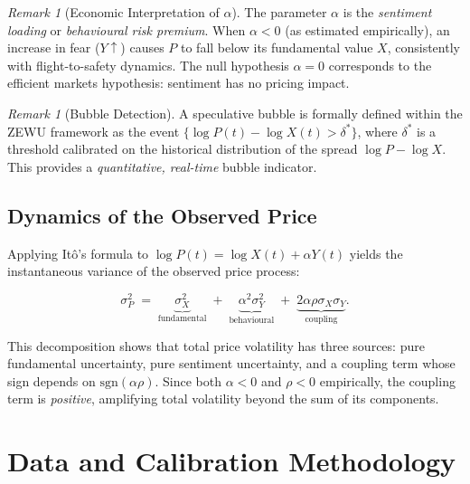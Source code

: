 \documentclass[12pt,a4paper]{article}
\theoremstyle{definition}
\theoremstyle{remark}
\newtheorem{remark}[theorem]{Remark}
\begin{document}
\begin{remark}[Economic Interpretation of $\alpha$]
  The parameter $\alpha$ is the \emph{sentiment loading} or
  \emph{behavioural risk premium}. When $\alpha < 0$ (as estimated
  empirically), an increase in fear ($Y \uparrow$) causes $P$ to fall
  below its fundamental value $X$, consistently with flight-to-safety
  dynamics. The null hypothesis $\alpha = 0$ corresponds to the
  efficient markets hypothesis: sentiment has no pricing impact.
\end{remark}

\begin{remark}[Bubble Detection]
  A speculative bubble is formally defined within the ZEWU framework as
  the event $\{\log P(t) - \log X(t) > \delta^*\}$, where $\delta^*$ is
  a threshold calibrated on the historical distribution of the spread
  $\log P - \log X$. This provides a \emph{quantitative, real-time}
  bubble indicator.
\end{remark}

\subsection{Dynamics of the Observed Price}

Applying It\^{o}'s formula to $\log P(t) = \log X(t) + \alpha Y(t)$
yields the instantaneous variance of the observed price process:

\begin{equation}
  \sigma_P^2 \;=\; \underbrace{\sigma_X^2}_{\text{fundamental}}
               \;+\; \underbrace{\alpha^2\sigma_Y^2}_{\text{behavioural}}
               \;+\; \underbrace{2\alpha\rho\sigma_X\sigma_Y}_{\text{coupling}}.
  \label{eq:sigma_P}
\end{equation}

This decomposition shows that total price volatility has three sources:
pure fundamental uncertainty, pure sentiment uncertainty, and a coupling
term whose sign depends on $\mathrm{sgn}(\alpha\rho)$. Since both
$\alpha < 0$ and $\rho < 0$ empirically, the coupling term is
\emph{positive}, amplifying total volatility beyond the sum of its
components.

\section{Data and Calibration Methodology}
\label{sec:data}
\end{document}
